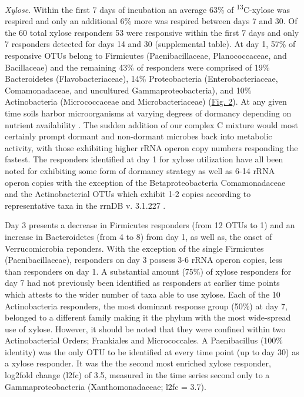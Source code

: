\textit{Xylose}. Within the first 7 days of incubation an average 63\% of \textsuperscript{13}C-xylose was respired and only an additional 6\% more was respired between days 7 and 30. Of the 60 total xylose responders 53 were responsive within the first 7 days and only 7 responders detected for days 14 and 30 (supplemental table). At day 1, 57\% of responsive OTUs belong to Firmicutes (Paenibacillaceae, Planococcaceae, and Bacillaceae) and the remaining 43\% of responders were comprised of 19\% Bacteroidetes (Flavobacteriaceae), 14\% Proteobacteria (Enterobacteriaceae, Comamonadaceae, and uncultured Gammaproteobacteria), and 10\% Actinobacteria (Micrococcaceae and Microbacteriaceae) (\href{https://www.authorea.com/users/3537/articles/3612/master/file/figures/l2fc_fig1/l2fc_fig.pdf}{Fig. 2}). At any given time soils harbor microorganisms at varying degrees of dormancy depending on nutrient availability \cite{Jones_2010}. The sudden addition of our complex C mixture would most certainly prompt dormant and non-dormant microbes back into metabolic activity, with those exhibiting higher rRNA operon copy numbers responding the fastest. The responders identified at day 1 for xylose utilization have all been noted for exhibiting some form of dormancy strategy \cite{Jones_2010, Mulyukin_2009, Darcy_2011, Sachidanandham_2008, Finkel_2006, Rittershaus_2013, Tada_2013, Lay_2013} as well as 6-14 rRNA operon copies with the exception of the Betaproteobacteria Comamonadaceae and the Actinobacterial OTUs which exhibit 1-2 copies according to representative taxa in the rrnDB v. 3.1.227 \cite{18948294,11125085}. 

Day 3 presents a decrease in Firmicutes responders (from 12 OTUs to 1) and an increase in Bacteroidetes (from 4 to 8) from day 1, as well as, the onset of Verrucomicrobia reponders. With the exception of the single Firmicutes (Paenibacillaceae), responders on day 3 possess 3-6 rRNA operon copies, less than responders on day 1. A substantial amount (75\%) of xylose responders for day 7 had not previously been identified as responders at earlier time points which attests to the wider number of taxa able to use xylose. Each of the 10 Actinobacteria responders, the most dominant response group (50\%) at day 7, belonged to a different family making it the phylum with the most wide-spread use of xylose. However, it should be noted that they were confined within two Actinobacterial Orders; Frankiales and Micrococcales. A Paenibacillus (100\% identity) was the only OTU to be identified at every time point (up to day 30) as a xylose responder. It was the the second most enriched xylose responder, log2fold change (l2fc) of 3.5, measured in the time series second only to a Gammaproteobacteria (Xanthomonadaceae; l2fc = 3.7).   

